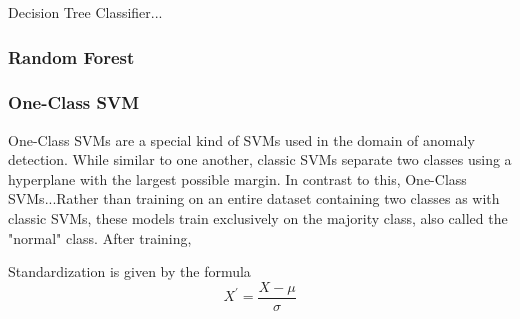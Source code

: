 \documentclass[12pt,a4paper]{article}
\numberwithin{figure}{section}
\numberwithin{table}{section}
\numberwithin{definition}{section}
\begin{document}
Decision Tree Classifier...

\subsubsection{Random Forest}
\label{ssec:randomforest}


\subsubsection{One-Class SVM}
\label{ssec:oneclasssvm}


One-Class SVMs are a special kind of SVMs used in the domain of anomaly detection. While similar to one another, classic SVMs separate two classes using a hyperplane with the largest possible margin. In contrast to this, One-Class SVMs...Rather than training on an entire dataset containing two classes as with classic SVMs, these models train exclusively on the majority class, also called the "normal" class. After training,  

Standardization is given by the formula \[X^{\prime} = \frac{X - \mu}{\sigma}\] 
\end{document}
